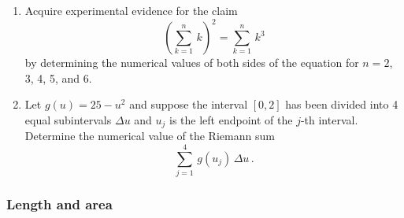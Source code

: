 \begin{enumerate}
\begin{enumerate}
\end{enumerate}
\item Acquire experimental evidence for the claim
	\[
\left(\sum_{k =1}^n \, k \right)^2 =
		\sum_{k =1}^n \, k^3
\]
by determining the numerical values of both sides of the equation for $n = 2$, 3, 4, 5, and 6.


\item Let $g(u) = 25 - u^2$ and suppose the interval $[0, 2]$ has been
divided into 4 equal subintervals $\Delta u$ and $u_j$ is the left
endpoint of the $j$-th interval.  Determine the numerical value of the
Riemann sum
	\[
\sum_{j = 1}^4 \, g(u_j) \, \Delta u \, .
\]


\end{enumerate}
\subsubsection{Length and area}
\label{subsubsec:length-and-area}




